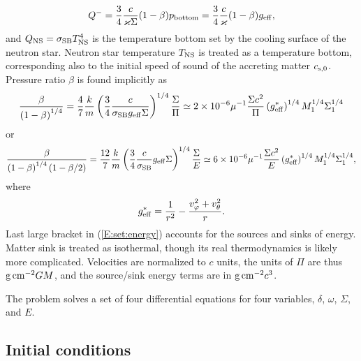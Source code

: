\documentclass[usenatbib,onecolumn]{mnras}
\begin{document}
\begin{equation}\label{E:set:qminus}
Q^- = \frac{3}{4} \frac{c}{\varkappa \Sigma}(1-\beta) p_{\rm bottom} =
\frac{3}{4} \frac{c}{\varkappa} (1-\beta) g_{\rm eff},
\end{equation}
and $Q_{\rm NS} =  \sigma_{\rm SB} T_{\rm NS}^4$ is the temperature bottom set
by the cooling surface of the neutron star. Neutron star temperature $T_{\rm
  NS}$ is treated as a temperature bottom, corresponding also to the initial speed
of sound of the accreting matter $c_{\rm s, 0}$.  Pressure ratio $\beta$ is found
implicitly as
\begin{equation}\label{E:set:betaP}
\frac{\beta}{\left(1-\beta\right)^{1/4}} = \frac{4}{7} \frac{k}{m}
\left(\frac{3}{4}\frac{c}{\sigma_{\rm SB} g_{\rm eff} \Sigma} \right)^{1/4}
\frac{\Sigma}{\Pi} \simeq 2\times 10^{-6} \mu^{-1} \frac{\Sigma c^2}{\Pi}
\left(g_{\rm eff}^*\right)^{1/4} M_1^{1/4} \Sigma_1^{1/4}
\end{equation}
or
\begin{equation}\label{E:set:betaE}
\displaystyle \frac{\beta}{\left(1-\beta\right)^{1/4}\left(1-\beta/2\right)} = \frac{12}{7} \frac{k}{m}
\left(\frac{3}{4}\frac{c}{\sigma_{\rm SB}} g_{\rm eff} \Sigma \right)^{1/4}
\frac{\Sigma}{E} \simeq 6\times 10^{-6} \mu^{-1} \frac{\Sigma c^2}{E}
\left(g_{\rm eff}^*\right)^{1/4} M_1^{1/4} \Sigma_1^{1/4},
\end{equation}
where
\begin{equation}\label{E:set:gravity}
g_{\rm eff}^* = \frac{1}{r^2} - \frac{v_\varphi^2 + v_\theta^2}{r}.
\end{equation}
Last large bracket in (\ref{E:set:energy}) accounts for the sources and sinks
of energy. Matter sink is treated as isothermal, though its real
thermodynamics is likely more complicated. 
Velocities are normalized to $c$ units, the units of $\Pi$ are thus ${\rm g\,
  cm^{-2}} GM$, and the source/sink energy terms are in ${\rm g\,
  cm^{-2}} c^3$. 

The problem solves a set of four differential equations for four variables,
$\delta$, $\omega$, $\Sigma$, and $E$.

\subsection{Initial conditions}
\end{document}
